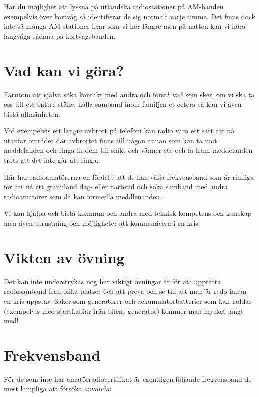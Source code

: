 Har du möjlighet att lyssna på utländska radiostationer på AM-banden
exempelvis över kortvåg så identifierar de sig normalt varje timme. Det finns
dock inte så många AM-stationer kvar som vi hör längre men på natten kan vi
höra långväga sådana på kortvågsbanden.

\section{Vad kan vi göra?}

Färutom att själva söka kontakt med andra och förstå vad som sker, om vi ska
ta oss till ett bättre ställe, hålla samband inom familjen et cetera så kan vi
även bistå allmänheten.

Vid exempelvis ett längre avbrott på telefoni kan radio vara ett sätt att nå
utanför området där avbrottet finns till någon annan som kan ta mot
meddelanden och ringa in dem till släkt och vänner etc och få fram meddelanden
trots att det inte går att ringa.

Här har radioamatörerna en fördel i att de kan välja frekvensband som är
rimliga för att nå ett grannland dag- eller nattetid och söka samband med
andra radioamatörer som då kan förmedla meddlenanden.

Vi kan hjälpa och bistå kommun och andra med teknisk kompetens och kunskap men
även utrustning och möjligheter att kommunicera i en kris.


\section{Vikten av övning}

Det kan inte understrykas nog hur viktigt övningar är för att upprätta
radiosamband från olika platser och att prova och se till att man är redo
innan en kris uppstår. Saker som generatorer och ackumulatorbatterier som kan
laddas (exempelvis med startkablar från bilens generator) kommer man mycket
långt med!

\section{Frekvensband}

För de som inte har amatörradiocertifikat är egentligen följande frekvensband de mest lämpliga att försöka använda:

